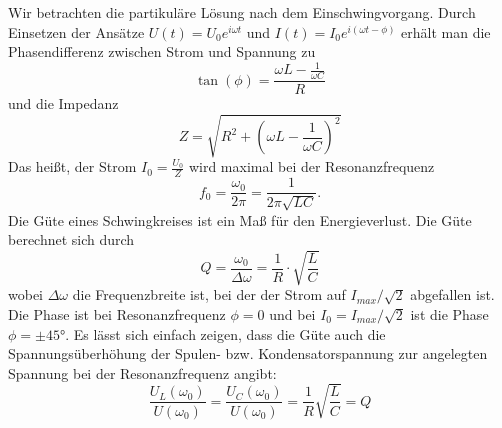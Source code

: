 \documentclass[12pt,a4paper]{article}
\begin{document}
Wir betrachten die partikuläre Lösung nach dem Einschwingvorgang. 
Durch Einsetzen der Ansätze $U(t)=U_0e^{i\omega t}$ und $I(t)=I_0e^{i(\omega t-\phi)}$ erhält man die Phasendifferenz zwischen Strom und Spannung zu
\begin{equation}
\tan(\phi)=\frac{\omega L-\frac{1}{\omega C}}{R}
\end{equation}
und die Impedanz
\begin{equation}
Z=\sqrt{R^2+(\omega L-\frac{1}{\omega C})^2}
\end{equation}
Das heißt, der Strom $I_0=\frac{U_0}{Z}$ wird maximal bei der Resonanzfrequenz
\begin{equation}
f_0=\frac{\omega_0}{2\pi}=\frac{1}{2\pi \sqrt{LC}}.
\end{equation}
Die Güte eines Schwingkreises ist ein Maß für den Energieverlust. Die Güte berechnet sich durch
\begin{equation}\label{eq:guete_aus_bauteile}
Q=\frac{\omega_0}{\Delta \omega}=\frac{1}{R}\cdot \sqrt{\frac{L}{C}}
\end{equation}
wobei $\Delta \omega$ die Frequenzbreite ist, bei der der Strom auf $I_{max}/\sqrt{2}$ abgefallen ist. Die Phase ist bei Resonanzfrequenz $\phi=0$ und bei $I_0=I_{max}/\sqrt{2}$ ist die Phase $\phi=\pm\ang{45}$.
Es lässt sich einfach zeigen, dass die Güte auch die Spannungsüberhöhung der Spulen- bzw. Kondensatorspannung zur angelegten Spannung bei der Resonanzfrequenz angibt:
\begin{equation}
\frac{U_L(\omega_0)}{U(\omega_0)}=\frac{U_C(\omega_0)}{U(\omega_0)}=\frac{1}{R}\sqrt{\frac{L}{C}}=Q
\end{equation}
\end{document}
